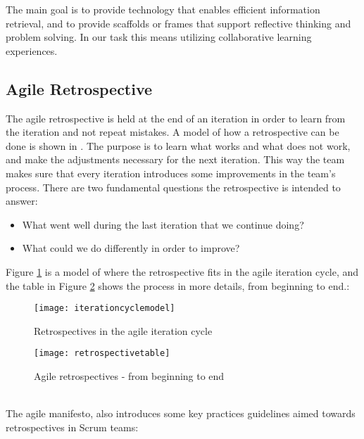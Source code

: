 The main goal is to provide technology that enables efficient information retrieval, and to provide scaffolds or frames that support reflective thinking and problem solving. In our task this means utilizing collaborative learning experiences. 

\subsection{Agile Retrospective}
The agile retrospective is held at the end of an iteration in order to learn from the iteration and not repeat mistakes. A model of how a retrospective can be done is shown in \citep{Derby2006}. The purpose is to learn what works and what does not work, and make the adjustments necessary for the next iteration. This way the team makes sure that every iteration introduces some improvements in the team's process. There are two fundamental questions the retrospective is intended to answer:
\begin{itemize}
\item What went well during the last iteration that we continue doing?
\item What could we do differently in order to improve?
\end{itemize}
Figure \ref{fig:itcyclemodel} is a model of where the retrospective fits in the agile iteration cycle, and the table in Figure \ref{fig:retrospectivetable} shows the process in more details, from beginning to end.\citep{Derby2006}:
\begin{figure}[!htpb]
\centering
	\texttt{[image: iterationcyclemodel]}
\caption{Retrospectives in the agile iteration cycle \citep{Derby2006}}
\label{fig:itcyclemodel}
\end{figure}
\begin{figure}[!htpb]
\centering
	\texttt{[image: retrospectivetable]}
\caption{Agile retrospectives - from beginning to end \citep{Derby2006}}
\label{fig:retrospectivetable}
\end{figure}
\\
The agile manifesto, also introduces some key practices guidelines aimed towards retrospectives in Scrum teams\citep{agilemanifesto}:
